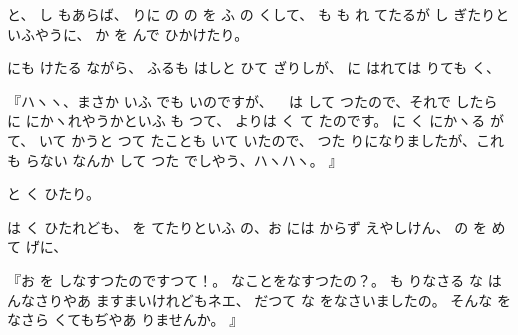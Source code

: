 と、
し
もあらば、
りに
の
の
を
ふ
の
くして、
も
も
れ
てたるが
し
ぎたりといふやうに、
か
を
んで
ひかけたり。

にも
けたる
ながら、
ふるも
はしと
ひて
ざりしが、
に
はれては
りても
く、

『ハヽヽ、まさか
いふ
でも
いのですが、
\ %
は
して
つたので、それで
したら
に
にかヽれやうかといふ
も
つて、
よりは
く
て
たのです。
に
く
にかヽる
が
て、
いて
かうと
つて
たことも
いて
いたので、
つた
りになりましたが、これも
らない
なんか
して
つた
でしやう、ハヽハヽ。
』

と
く
ひたり。

は
く
ひたれども、
を
てたりといふ
の、お
には
からず
えやしけん、
の
を
めて
げに、

『お
を
しなすつたのですつて！。
なことをなすつたの？。
も
りなさる
な
は
んなさりやあ
ますまいけれどもネエ、
だつて
な
をなさいましたの。
そんな
をなさら
くてもぢやあ
りませんか。
』

